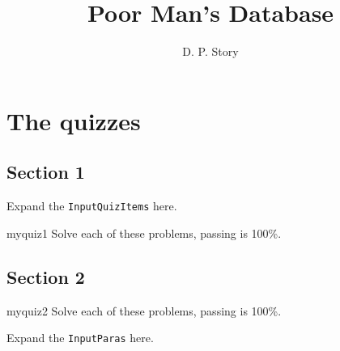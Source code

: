\documentclass{book}
\title{Poor Man's Database}
\author{D. P. Story}
\def\cs#1{\texttt{\eqbs#1}}
\begin{document}
\maketitle

\tableofcontents

\chapter{The quizzes}

\section{Section 1}

Expand the \cs{InputQuizItems} here.

\InputQuizItems

\begin{quiz*}{myquiz1}
Solve each of these problems, passing is 100\%.
\begin{questions}




\end{questions}
\end{quiz*}

\section{Section 2}

\begin{quiz*}{myquiz2}
Solve each of these problems, passing is 100\%.
\begin{questions}




\end{questions}
\end{quiz*} %

\medskip\noindent
\displayChoices{}{11bp}


\medskip\noindent
Expand the \cs{InputParas} here.
\InputParas


%

\medskip\noindent
\displayChoices{}{11bp}\cgBdry[1em]\clrChoices{}{11bp}
\end{document}
